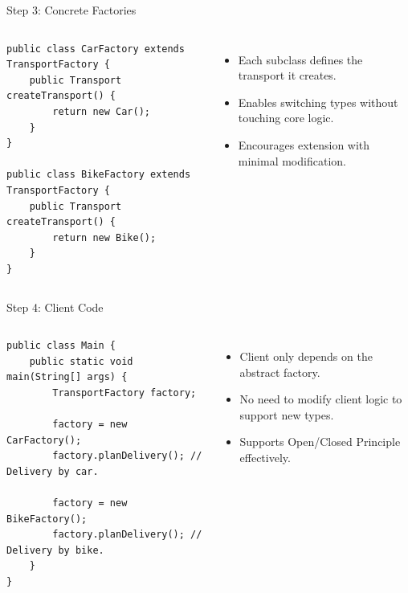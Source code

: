 \documentclass[aspectratio=169, table]{beamer}
\begin{document}
\begin{frame}[fragile]{Step 3: Concrete Factories}
\vspace{5pt}
\begin{columns}[T]
\begin{lstlisting}[style=JavaStyle]
public class CarFactory extends TransportFactory {
	public Transport createTransport() {
		return new Car();
	}
}

public class BikeFactory extends TransportFactory {
	public Transport createTransport() {
		return new Bike();
	}
}
\end{lstlisting}

\begin{itemize}
\item Each subclass defines the transport it creates.
\item Enables switching types without touching core logic.
\item Encourages extension with minimal modification.
\end{itemize}
\end{columns}
\end{frame}

\begin{frame}[fragile]{Step 4: Client Code}
\vspace{5pt}
\begin{columns}[T]
\begin{lstlisting}[style=JavaStyle]
public class Main {
	public static void main(String[] args) {
		TransportFactory factory;
		
		factory = new CarFactory();
		factory.planDelivery(); // Delivery by car.
		
		factory = new BikeFactory();
		factory.planDelivery(); // Delivery by bike.
	}
}
\end{lstlisting}

\begin{itemize}
\item Client only depends on the abstract factory.
\item No need to modify client logic to support new types.
\item Supports Open/Closed Principle effectively.
\end{itemize}
\end{columns}
\end{frame}
\end{document}
